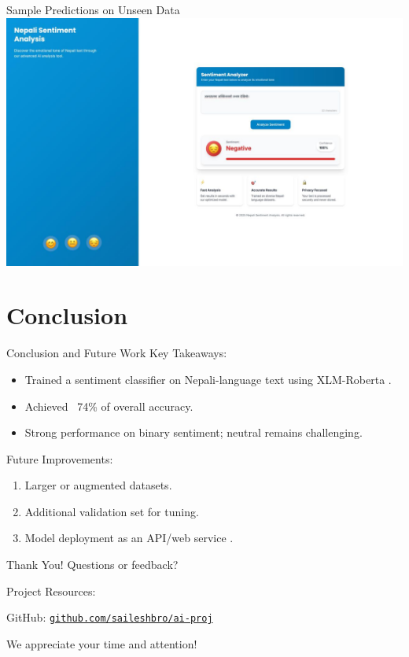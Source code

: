 \documentclass[aspectratio=169]{beamer}
\begin{document}
\begin{frame}{Sample Predictions on Unseen Data}
  \centering
  \includegraphics[width=0.75\linewidth]{visual.jpeg}
\end{frame}

\section{Conclusion}
\begin{frame}{Conclusion and Future Work}
  Key Takeaways:
  \begin{itemize}
    \item Trained a sentiment classifier on Nepali-language text using XLM-Roberta \parencite{conneau-etal-2020-unsupervised,timilsina-etal-2022-nepberta}.
    \item Achieved ~74\% of overall accuracy.
    \item Strong performance on binary sentiment; neutral remains challenging.
  \end{itemize}

  Future Improvements:
  \begin{enumerate}
    \item Larger or augmented datasets.
    \item Additional validation set for tuning.
    \item Model deployment as an API/web service \parencite{fastapi}.
  \end{enumerate}
\end{frame}

\begin{frame}{Thank You!}
  \centering
  Questions or feedback?

  \vspace{2em}

  Project Resources:

  {\footnotesize
  GitHub: {\texttt{\href{https://github.com/saileshbro/ai-proj}{github.com/saileshbro/ai-proj}}}}

  \vspace{2em}

  We appreciate your time and attention!
\end{frame}

\begin{frame}[allowframebreaks]
  \printbibliography
\end{frame}
\end{document}
